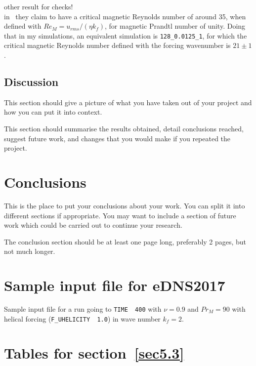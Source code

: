 \documentclass[12pt,a4paper]{report}
\begin{document}
other result for checks!\\

in~\cite{haugen2004simulations} they claim to have a critical magnetic Reynolds number of around 35, when defined with $Re_M=u_{rms}/(\eta k_f)$, for magnetic Prandtl number of unity. Doing that in my simulations, an equivalent simulation is \texttt{128\_0.0125\_1}, for which the critical magnetic Reynolds number defined with the forcing wavenumber is $21 \pm 1$.











\section{Discussion}

This section should give a picture of what you have taken out of your
project and how you can put it into context.

This section should summarise the results obtained, detail conclusions
reached, suggest future work, and changes that you would make if you
repeated the project.

\chapter{Conclusions}

This is the place to put your conclusions about your work. You can
split it into different sections if appropriate. You may want to include
a section of future work which could be carried out to continue your
research.

The conclusion section should be at least one page long, preferably 2
pages, but not much longer.

\appendix
\chapter{Sample input file for eDNS2017}
\label{apx1}

Sample input file for a run going to \texttt{TIME~~400} with $\nu=0.9$ and $Pr_M=90$ with helical forcing (\texttt{F\_UHELICITY~~1.0}) in wave number $k_f=2$.



\chapter{Tables for section~\ref{sec5.3}}
\end{document}
